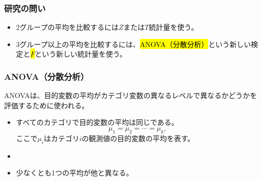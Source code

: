 
\begin{frame}
\frametitle{研究の問い}


\vspace{0.5cm}

\begin{itemize}

\item 2グループの平均を比較するには$Z$または$T$統計量を使う。

\item 3グループ以上の平均を比較するには、\hl{ANOVA（分散分析）}という新しい検定と\hl{$F$}という新しい統計量を使う。

\end{itemize}

\end{frame}


\begin{frame}
\frametitle{ANOVA（分散分析）}

ANOVAは、目的変数の平均がカテゴリ変数の異なるレベルで異なるかどうかを評価するために使われる。

\begin{itemize}
\item[]  すべてのカテゴリで目的変数の平均は同じである。
\[\mu_1 = \mu_2 = \cdots = \mu_k, \]
ここで$\mu_i$はカテゴリ$i$の観測値の目的変数の平均を表す。
\item[]
\item[]  少なくとも1つの平均が他と異なる。
\end{itemize}

\end{frame}


